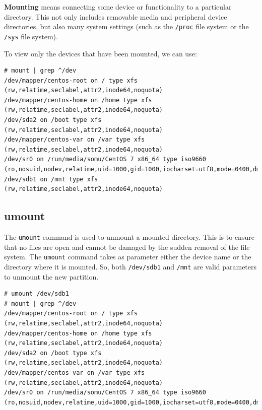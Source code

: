 \noindent
\textbf{Mounting} means connecting some device or functionality to a particular directory. This not only includes removable media and peripheral device directories, but also many system settings (such as the \verb|/proc| file system or the \verb|/sys| file system). 

To view only the devices that have been mounted, we can use:

\vspace{-15pt}
\begin{verbatim}
# mount | grep ^/dev
/dev/mapper/centos-root on / type xfs (rw,relatime,seclabel,attr2,inode64,noquota)
/dev/mapper/centos-home on /home type xfs (rw,relatime,seclabel,attr2,inode64,noquota)
/dev/sda2 on /boot type xfs (rw,relatime,seclabel,attr2,inode64,noquota)
/dev/mapper/centos-var on /var type xfs (rw,relatime,seclabel,attr2,inode64,noquota)
/dev/sr0 on /run/media/somu/CentOS 7 x86_64 type iso9660 (ro,nosuid,nodev,relatime,uid=1000,gid=1000,iocharset=utf8,mode=0400,dmode=0500,uhelper=udisks2)
/dev/sdb1 on /mnt type xfs (rw,relatime,seclabel,attr2,inode64,noquota)
\end{verbatim}
\vspace{-10pt}

\subsection{umount}
The \verb|umount| command is used to unmount a mounted directory. This is to ensure that no files are open and cannot be damaged by the sudden removal of the file system. The \verb|umount| command takes as parameter either the device name or the directory where it is mounted. So, both \verb|/dev/sdb1| and \verb|/mnt| are valid parameters to unmount the new partition. 

\vspace{-15pt}
\begin{verbatim}
# umount /dev/sdb1
# mount | grep ^/dev
/dev/mapper/centos-root on / type xfs (rw,relatime,seclabel,attr2,inode64,noquota)
/dev/mapper/centos-home on /home type xfs (rw,relatime,seclabel,attr2,inode64,noquota)
/dev/sda2 on /boot type xfs (rw,relatime,seclabel,attr2,inode64,noquota)
/dev/mapper/centos-var on /var type xfs (rw,relatime,seclabel,attr2,inode64,noquota)
/dev/sr0 on /run/media/somu/CentOS 7 x86_64 type iso9660 (ro,nosuid,nodev,relatime,uid=1000,gid=1000,iocharset=utf8,mode=0400,dmode=0500,uhelper=udisks2)
\end{verbatim}
\vspace{-10pt}

